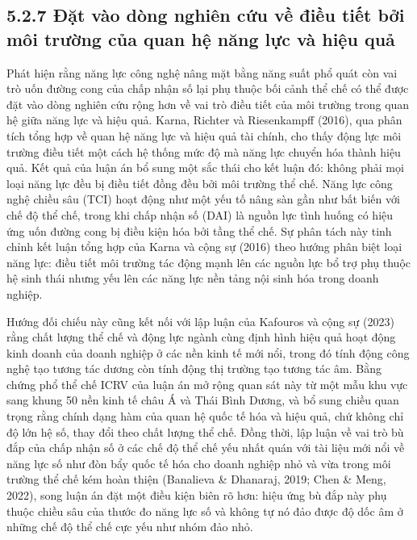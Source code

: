 \documentclass[
  a4paper,
  13pt]{extreport}
\begin{document}
\hypertarget{ux111ux1eb7t-vuxe0o-duxf2ng-nghiuxean-cux1ee9u-vux1ec1-ux111iux1ec1u-tiux1ebft-bux1edfi-muxf4i-trux1b0ux1eddng-cux1ee7a-quan-hux1ec7-nux103ng-lux1ef1c-vuxe0-hiux1ec7u-quux1ea3}{%
\subsection{5.2.7 Đặt vào dòng nghiên cứu về điều tiết bởi môi trường
của quan hệ năng lực và hiệu
quả}\label{ux111ux1eb7t-vuxe0o-duxf2ng-nghiuxean-cux1ee9u-vux1ec1-ux111iux1ec1u-tiux1ebft-bux1edfi-muxf4i-trux1b0ux1eddng-cux1ee7a-quan-hux1ec7-nux103ng-lux1ef1c-vuxe0-hiux1ec7u-quux1ea3}}

Phát hiện rằng năng lực công nghệ nâng mặt bằng năng suất phổ quát còn
vai trò uốn đường cong của chấp nhận số lại phụ thuộc bối cảnh thể chế
có thể được đặt vào dòng nghiên cứu rộng hơn về vai trò điều tiết của
môi trường trong quan hệ giữa năng lực và hiệu quả. Karna, Richter và
Riesenkampff (2016), qua phân tích tổng hợp về quan hệ năng lực và hiệu
quả tài chính, cho thấy động lực môi trường điều tiết một cách hệ thống
mức độ mà năng lực chuyển hóa thành hiệu quả. Kết quả của luận án bổ
sung một sắc thái cho kết luận đó: không phải mọi loại năng lực đều bị
điều tiết đồng đều bởi môi trường thể chế. Năng lực công nghệ chiều sâu
(TCI) hoạt động như một yếu tố nâng sàn gần như bất biến với chế độ thể
chế, trong khi chấp nhận số (DAI) là nguồn lực tình huống có hiệu ứng
uốn đường cong bị điều kiện hóa bởi tầng thể chế. Sự phân tách này tinh
chỉnh kết luận tổng hợp của Karna và cộng sự (2016) theo hướng phân biệt
loại năng lực: điều tiết môi trường tác động mạnh lên các nguồn lực bổ
trợ phụ thuộc hệ sinh thái nhưng yếu lên các năng lực nền tảng nội sinh
hóa trong doanh nghiệp.

Hướng đối chiếu này cũng kết nối với lập luận của Kafouros và cộng sự
(2023) rằng chất lượng thể chế và động lực ngành cùng định hình hiệu quả
hoạt động kinh doanh của doanh nghiệp ở các nền kinh tế mới nổi, trong
đó tính động công nghệ tạo tương tác dương còn tính động thị trường tạo
tương tác âm. Bằng chứng phổ thể chế ICRV của luận án mở rộng quan sát
này từ một mẫu khu vực sang khung 50 nền kinh tế châu Á và Thái Bình
Dương, và bổ sung chiều quan trọng rằng chính dạng hàm của quan hệ quốc
tế hóa và hiệu quả, chứ không chỉ độ lớn hệ số, thay đổi theo chất lượng
thể chế. Đồng thời, lập luận về vai trò bù đắp của chấp nhận số ở các
chế độ thể chế yếu nhất quán với tài liệu mới nổi về năng lực số như đòn
bẩy quốc tế hóa cho doanh nghiệp nhỏ và vừa trong môi trường thể chế kém
hoàn thiện (Banalieva \& Dhanaraj, 2019; Chen \& Meng, 2022), song luận
án đặt một điều kiện biên rõ hơn: hiệu ứng bù đắp này phụ thuộc chiều
sâu của thước đo năng lực số và không tự nó đảo được độ dốc âm ở những
chế độ thể chế cực yếu như nhóm đảo nhỏ.
\end{document}
